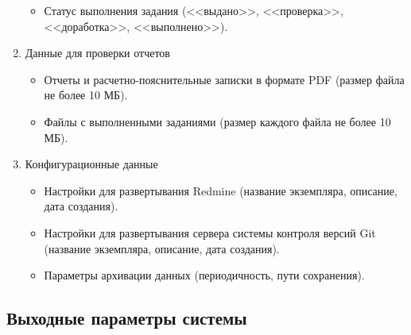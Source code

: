 \begin{enumerate}
\begin{itemize}
		\item Статус выполнения задания (<<выдано>>, <<проверка>>, <<доработка>>, <<выполнено>>).
	\end{itemize}
	\item Данные для проверки отчетов
	\begin{itemize} 
	\item Отчеты и расчетно-пояснительные записки в формате PDF (размер файла не более 10 МБ).
	\item Файлы с выполненными заданиями (размер каждого файла не более 10 МБ).
	\end{itemize}
	\item Конфигурационные данные
		\begin{itemize} 
		\item Настройки для развертывания Redmine (название экземпляра, описание, дата создания).
		\item Настройки для развертывания сервера системы контроля версий Git (название экземпляра, описание, дата создания).
		\item Параметры архивации данных (периодичность, пути сохранения).
	\end{itemize}
\end{enumerate}

\subsection*{Выходные параметры системы}

